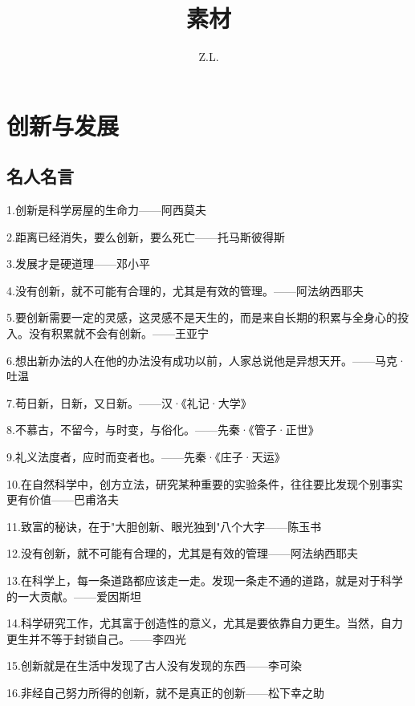 \documentclass[UTF8]{ctexart}
\title{素材}
\author{Z.L.}
\begin{document}
\maketitle\section{创新与发展}
\subsection{名人名言}
1.创新是科学房屋的生命力——阿西莫夫\par
2.距离已经消失，要么创新，要么死亡——托马斯彼得斯\par
3.发展才是硬道理——邓小平\par
4.没有创新，就不可能有合理的，尤其是有效的管理。——阿法纳西耶夫\par
5.要创新需要一定的灵感，这灵感不是天生的，而是来自长期的积累与全身心的投入。没有积累就不会有创新。——王亚宁\par
6.想出新办法的人在他的办法没有成功以前，人家总说他是异想天开。——马克·吐温\par
7.苟日新，日新，又日新。——汉·《礼记·大学》\par
8.不慕古，不留今，与时变，与俗化。——先秦·《管子·正世》\par
9.礼义法度者，应时而变者也。——先秦·《庄子·天运》\par
10.在自然科学中，创方立法，研究某种重要的实验条件，往往要比发现个别事实更有价值——巴甫洛夫\par
11.致富的秘诀，在于"大胆创新、眼光独到"八个大字——陈玉书\par
12.没有创新，就不可能有合理的，尤其是有效的管理——阿法纳西耶夫\par
13.在科学上，每一条道路都应该走一走。发现一条走不通的道路，就是对于科学的一大贡献。——爱因斯坦\par
14.科学研究工作，尤其富于创造性的意义，尤其是要依靠自力更生。当然，自力更生并不等于封锁自己。——李四光\par
15.创新就是在生活中发现了古人没有发现的东西——李可染\par
16.非经自己努力所得的创新，就不是真正的创新——松下幸之助\par
\end{document}
